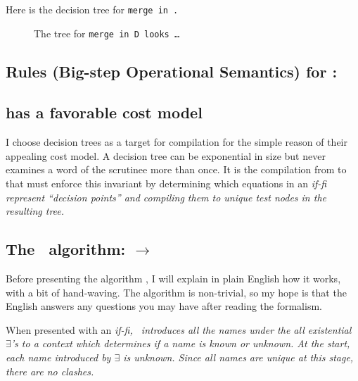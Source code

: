 \documentclass[manuscript,screen,review, 12pt, nonacm]{acmart}
\begin{document}
    Here is the decision tree for \tt{merge} in \D. 

    \begin{figure}[H]
        \caption{The tree for \tt{merge} in D looks \dots {}}
    \end{figure}


    \subsection{Rules (Big-step Operational Semantics) for \D:}
    

    \subsection{\D has a favorable cost model}
    I choose decision trees as a target for compilation for the simple reason of
    their appealing cost model. A decision tree can be exponential in size but
    never examines a word of the scrutinee more than once. It is the compilation
    from \VMinus to \D that must enforce this invariant by determining which
    equations in an \it{if-fi} represent “decision points” and compiling them to
    unique \it{test} nodes in the resulting tree. 
    
    \subsection{The \DTran\ algorithm: \VMinus $\rightarrow$ \D}

    Before presenting the algorithm \DTran, I will explain in plain English how
    it works, with a bit of hand-waving. The algorithm is non-trivial, so my
    hope is that the English answers any questions you may have after reading 
    the formalism. 

    When presented with an \it{if-fi}, \DTran\ introduces all the names under
    the all existential $\exists$'s to a context which determines if a name is
    \it{known} or \it{unknown}. At the start, each name introduced by $\exists$
    is \it{unknown}. Since all names are unique at this stage, there are no
    clashes. 


\end{document}
